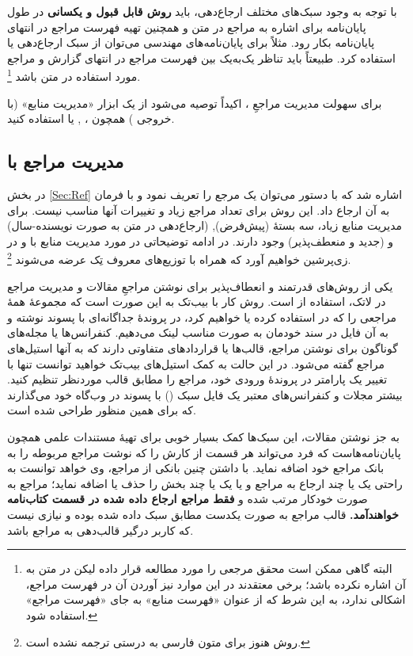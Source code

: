 با توجه به وجود سبک‌های مختلف ارجاع‌دهی، باید
\textbf{روش قابل قبول و یکسانی}
در طول پایان‌نامه برای اشاره به مراجع در متن و همچنین تهیه فهرست مراجع در انتهای پایان‌نامه بکار رود. مثلاً برای پایان‌نامه‌های مهندسی می‌توان از سبک ارجاع‌دهی
%
یا
استفاده کرد. طبیعتاً باید تناظر یک‌به‌یک بین فهرست مراجع در انتهای گزارش و مراجع مورد استفاده در متن باشد%
\footnote{البته گاهی ممکن است محقق مرجعی را مورد مطالعه قرار داده لیکن در متن به آن اشاره نکرده باشد؛ برخی معتقدند در این موارد نیز آوردن آن در فهرست مراجع، اشکالی ندارد، به این شرط که از عنوان «فهرست منابع» به جای «فهرست مراجع» استفاده شود.}.

برای سهولت مدیریت مراجعِ \پ%
، اکیداً توصیه می‌شود از یک ابزار «مدیریت منابع» (با خروجی
\texorpdfstring{}{Bib\TeX}%
) همچون
،
,
یا
استفاده کنید.

\subsection{ مدیریت مراجع با  \texorpdfstring{}{Bib\TeX}}
در بخش \ref{Sec:Ref} اشاره شد که با دستور 
  می‌توان یک مرجع را تعریف نمود و با فرمان
  به آن ارجاع داد. این روش برای تعداد مراجع زیاد و تغییرات آنها مناسب نیست. برای مدیریت منابع زیاد، سه بستهٔ
 (پیش‌فرض),
(ارجاع‌دهی در متن به صورت نویسنده-سال)
و  (جدید و منعطف‌پذیر)
وجود دارند. در ادامه توضیحاتی در مورد مدیریت منابع با  و  در زی‌پرشین خواهیم آورد که همراه با توزیع‌های معروف تِک عرضه می‌شوند
\footnote{روش  هنوز برای متون فارسی به درستی ترجمه نشده است.}.

یکی از روش‌های قدرتمند و انعطاف‌پذیر برای نوشتن مراجعِ مقالات و مدیریت مراجع در لاتک، استفاده از   است.
 روش کار با بیب‌تک به این صورت است که مجموعهٔ همهٔ مراجعی را که در \پ استفاده کرده یا خواهیم کرد، 
در پروندهٔ جداگانه‌ای با پسوند
نوشته و به آن فایل در سند خودمان به صورت مناسب لینک می‌دهیم.
 کنفرانس‌ها یا مجله‌های گوناگون برای نوشتن مراجع، قالب‌ها یا قراردادهای متفاوتی دارند که به آنها استیل‌های مراجع گفته می‌شود.
 در این حالت به کمک ‌استیل‌های بیب‌تک خواهید توانست تنها با تغییر یک پارامتر در پروندهٔ ورودی خود، مراجع را مطابق قالب موردنظر تنظیم کنید. 
 بیشتر مجلات و کنفرانس‌های معتبر یک فایل سبک
 ()
با پسوند  در وب‌گاه خود می‌گذارند که برای همین منظور طراحی شده است.

به جز نوشتن مقالات، این سبک‌ها کمک بسیار خوبی برای تهیهٔ مستندات علمی همچون پایان‌نامه‌هاست که فرد می‌تواند هر قسمت از کارش را که نوشت مراجع مربوطه را به بانک مراجع خود اضافه نماید. با داشتن چنین بانکی از مراجع، وی خواهد توانست به راحتی یک یا چند ارجاع به مراجع و یا یک یا چند بخش را حذف یا اضافه ‌نماید؛ 
مراجع به صورت خودکار مرتب شده و
\textbf{فقط مراجع ارجاع داده شده در قسمت کتاب‌نامه خواهندآمد.}
قالب مراجع به صورت یکدست مطابق سبک داده شده بوده و نیازی نیست که کاربر درگیر قالب‌دهی به مراجع باشد. 

